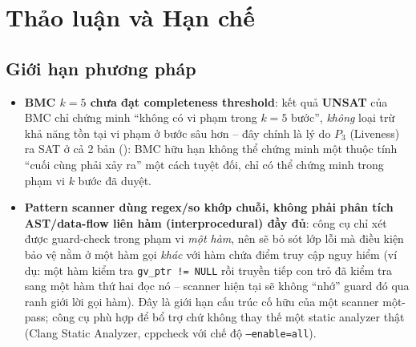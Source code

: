 \section{Thảo luận và Hạn chế}
\label{sec:thaoluan}

\subsection{Giới hạn phương pháp}

\begin{itemize}
  \item \textbf{BMC $k=5$ chưa đạt completeness threshold}: kết quả \textbf{UNSAT} của BMC chỉ chứng minh ``không có vi phạm trong $k=5$ bước'', \emph{không} loại trừ khả năng tồn tại vi phạm ở bước sâu hơn -- đây chính là lý do $P_3$ (Liveness) ra SAT ở cả 2 bản (): BMC hữu hạn không thể chứng minh một thuộc tính ``cuối cùng phải xảy ra'' một cách tuyệt đối, chỉ có thể chứng minh trong phạm vi $k$ bước đã duyệt.
  \item \textbf{Pattern scanner dùng regex/so khớp chuỗi, không phải phân tích AST/data-flow liên hàm (interprocedural) đầy đủ}: công cụ chỉ xét được guard-check trong phạm vi \emph{một hàm}, nên sẽ bỏ sót lớp lỗi mà điều kiện bảo vệ nằm ở một hàm gọi \emph{khác} với hàm chứa điểm truy cập nguy hiểm (ví dụ: một hàm kiểm tra \texttt{gv\_ptr != NULL} rồi truyền tiếp con trỏ đã kiểm tra sang một hàm thứ hai đọc nó -- scanner hiện tại sẽ không ``nhớ'' guard đó qua ranh giới lời gọi hàm). Đây là giới hạn cấu trúc cố hữu của một scanner một-pass; công cụ phù hợp để bổ trợ chứ không thay thế một static analyzer thật (Clang Static Analyzer, cppcheck với chế độ \texttt{--enable=all}).

\end{itemize}
